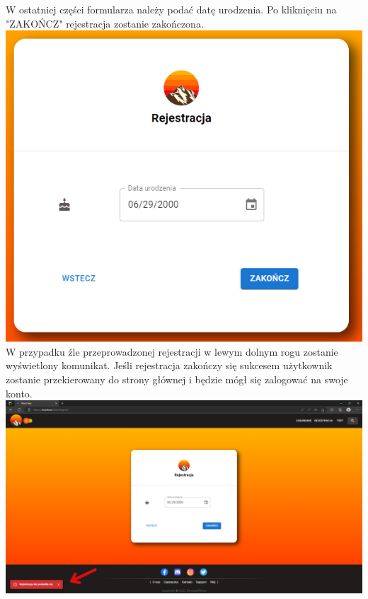 \documentclass[12pt]{article}
\begin{document}
\begin{flushleft}
\begin{itemize}
			W ostatniej części formularza należy podać datę urodzenia. Po kliknięciu na "ZAKOŃCZ" rejestracja zostanie zakończona.\linebreak
			\includegraphics[scale=0.3]{Rejestracja4.png} \linebreak
			W przypadku źle przeprowadzonej rejestracji w lewym dolnym rogu zostanie wyświetlony komunikat. Jeśli rejestracja zakończy się sukcesem użytkownik zostanie przekierowany do strony głównej i będzie mógł się zalogować na swoje konto.\linebreak
			\includegraphics[scale=0.7]{RejestracjaNieudana.png} \linebreak
			


\end{itemize}
\end{flushleft}
\end{document}
